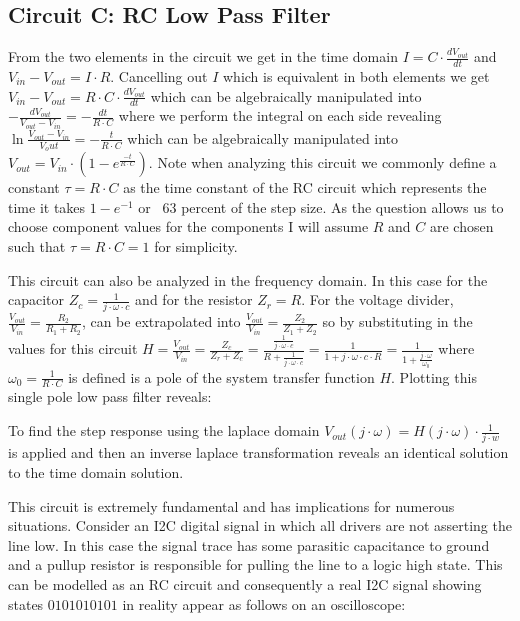 \documentclass[main.tex]{subfiles}
\begin{document}
\subsection{Circuit C: RC Low Pass Filter}
From the two elements in the circuit we get in the time domain $I = C \cdot \frac{dV_{out}}{dt}$ and $V_{in} - V_{out} = I \cdot R$. Cancelling out $I$ which is equivalent in both elements we get $V_{in} - V_{out} = R \cdot C \cdot \frac{dV_{out}}{dt}$ which can be algebraically manipulated into $-\frac{dV_{out}}{V_{out}-V_{in}} = -\frac{dt}{R \cdot C}$ where we perform the integral on each side revealing $\ln{\frac{V_{out}-V_{in}}{V_out}}=-\frac{t}{R \cdot C}$ which can be algebraically manipulated into $V_{out}=V_{in} \cdot (1-e^{\frac{-t}{R \cdot C}})$. Note when analyzing this circuit we commonly define a constant $\tau = R \cdot C$ as the time constant of the RC circuit which represents the time it takes $1-e^{-1}$ or ~63 percent of the step size. As the question allows us to choose component values for the components I will assume $R$ and $C$ are chosen such that $\tau = R \cdot C = 1$ for simplicity.


This circuit can also be analyzed in the frequency domain. In this case for the capacitor $Z_c = \frac{1}{j \cdot \omega \cdot c}$ and for the resistor $Z_r = R$. For the voltage divider, $\frac{V_{out}}{V_{in}} = \frac{R_2}{R_1 + R_2}$, can be extrapolated into $\frac{V_{out}}{V_{in}} = \frac{Z_2}{Z_1 + Z_2}$ so by substituting in the values for this circuit $H = \frac{V_{out}}{V_{in}} = \frac{Z_c}{Z_r + Z_c} = \frac{\frac{1}{j \cdot \omega \cdot c}}{R + \frac{1}{j \cdot \omega \cdot c}} = \frac{1}{1 + j \cdot \omega \cdot c \cdot R} = \frac{1}{1+\frac{j \cdot \omega}{\omega_{0}}}$ where $\omega_{0} = \frac{1}{R \cdot C}$ is defined is a pole of the system transfer function $H$. Plotting this single pole low pass filter reveals:


To find the step response using the laplace domain $V_{out}(j \cdot \omega) = H(j \cdot \omega) \cdot \frac{1}{j \cdot w}$ is applied and then an inverse laplace transformation reveals an identical solution to the time domain solution.

This circuit is extremely fundamental and has implications for numerous situations. Consider an I2C digital signal in which all drivers are not asserting the line low. In this case the signal trace has some parasitic capacitance to ground and a pullup resistor is responsible for pulling the line to a logic high state. This can be modelled as an RC circuit and consequently a real I2C signal showing states $0101010101$ in reality appear as follows on an oscilloscope:
\end{document}

